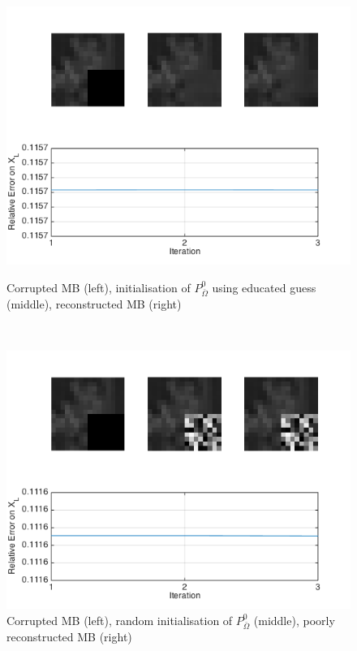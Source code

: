 \documentclass[a4paper, 11pt]{article} %
\def \bO{\bar{\Omega}}
\begin{document}
\begin{figure}[h!]
\begin{minipage}{0.45 \linewidth}
 \centering
\includegraphics[scale=0.38]{XInitConvergence}
\caption{Corrupted MB (left), initialisation of $P^0_{\bO}$ using educated guess (middle), reconstructed MB (right)\label{InitAverage}}
\end{minipage}
\begin{minipage}{0.1 \linewidth}
\ \ 
\end{minipage}
\begin{minipage}{0.45 \linewidth}
 \centering
\includegraphics[scale=0.38]{XInitRandom}
\caption{Corrupted MB (left), random initialisation of $P^0_{\bO}$  (middle), poorly reconstructed MB (right) \label{InitRandom}}
\end{minipage}
\end{figure}
\end{document}
